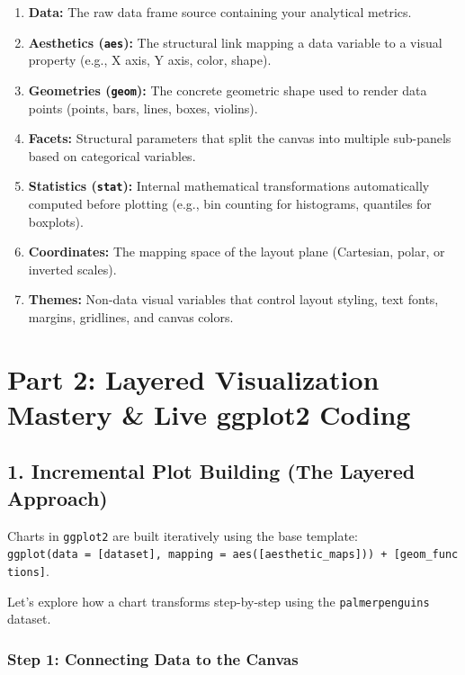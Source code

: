 \documentclass[
]{article}
\providecommand{\tightlist}{%
  \setlength{\itemsep}{0pt}\setlength{\parskip}{0pt}}
\begin{document}
\begin{enumerate}
\def\labelenumi{\arabic{enumi}.}
\tightlist
\item
  \textbf{Data:} The raw data frame source containing your analytical
  metrics.
\item
  \textbf{Aesthetics (\texttt{aes}):} The structural link mapping a data
  variable to a visual property (e.g., X axis, Y axis, color, shape).
\item
  \textbf{Geometries (\texttt{geom}):} The concrete geometric shape used
  to render data points (points, bars, lines, boxes, violins).
\item
  \textbf{Facets:} Structural parameters that split the canvas into
  multiple sub-panels based on categorical variables.
\item
  \textbf{Statistics (\texttt{stat}):} Internal mathematical
  transformations automatically computed before plotting (e.g., bin
  counting for histograms, quantiles for boxplots).
\item
  \textbf{Coordinates:} The mapping space of the layout plane
  (Cartesian, polar, or inverted scales).
\item
  \textbf{Themes:} Non-data visual variables that control layout
  styling, text fonts, margins, gridlines, and canvas colors.
\end{enumerate}

\section{Part 2: Layered Visualization Mastery \& Live ggplot2
Coding}\label{part-2-layered-visualization-mastery-live-ggplot2-coding}

\subsection{1. Incremental Plot Building (The Layered
Approach)}\label{incremental-plot-building-the-layered-approach}

Charts in \texttt{ggplot2} are built iteratively using the base
template:
\texttt{ggplot(data\ =\ {[}dataset{]},\ mapping\ =\ aes({[}aesthetic\_maps{]}))\ +\ {[}geom\_functions{]}}.

Let's explore how a chart transforms step-by-step using the
\texttt{palmerpenguins} dataset.

\subsubsection{Step 1: Connecting Data to the
Canvas}\label{step-1-connecting-data-to-the-canvas}
\end{document}
